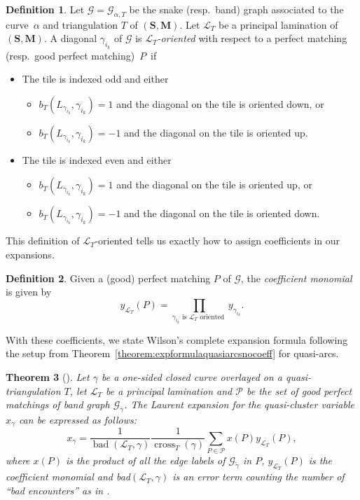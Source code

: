 \documentclass[10pt,a4paper]{amsart}
\numberwithin{equation}{section}
\newtheorem{Theorem}{Theorem}[section]
\theoremstyle{definition}
\newtheorem{Definition}[Theorem]{Definition}
\newcommand{\SM}{(\mathbf{S}, \mathbf{M})}
\begin{document}
\begin{Definition}\label{definition:L_Toriented}
Let $\mathcal{G} = \mathcal{G}_{\alpha, T}$ be the snake (resp.\ band) graph associated to the curve~$\alpha$ and triangulation $T$ of $\SM$. Let $\mathcal{L}_T$ be a principal lamination of~$\SM$. A diagonal $\gamma_{i_k}$ of $\mathcal{G}$ is \emph{$\mathcal{L}_T$-oriented} with respect to a perfect matching (resp.\ good perfect matching)~$P$~if
\begin{itemize}\itemsep=0pt
 \item The tile is indexed odd and either
 \begin{itemize}\itemsep=0pt
 \item $b_T(L_{\gamma_{i_k}}, \gamma_{i_k}) = 1$ and the diagonal on the tile is oriented down, or
 \item $b_T(L_{\gamma_{i_k}}, \gamma_{i_k}) = -1$ and the diagonal on the tile is oriented up.
 \end{itemize}
 \item The tile is indexed even and either
 \begin{itemize}\itemsep=0pt
 \item $b_T(L_{\gamma_{i_k}}, \gamma_{i_k}) = 1$ and the diagonal on the tile is oriented up, or
 \item $b_T(L_{\gamma_{i_k}}, \gamma_{i_k}) = -1$ and the diagonal on the tile is oriented down.
 \end{itemize}
\end{itemize}
\end{Definition}

This definition of $\mathcal{L}_T$-oriented tells us exactly how to assign coefficients in our expansions.
\begin{Definition}\label{definition:wilsoncoefficients}
Given a (good) perfect matching $P$ of $\mathcal{G}$, the \emph{coefficient monomial} is given by
\[y_{\mathcal{L}_T}(P) = \prod_{\gamma_{i_k} \text{ is } \mathcal{L}_T \text{ oriented }} y_{\gamma_{i_k}}.\]
\end{Definition}

With these coefficients, we state Wilson's complete expansion formula \cite[Theorem 5.44]{Wil19} following the setup from Theorem~\ref{theorem:expformulaquasiarcsnocoeff} for quasi-arcs.

\begin{Theorem}[\cite{Wil19}]
 Let $\gamma$ be a one-sided closed curve overlayed on a quasi-triangulation $T$, let $\mathcal{L}_T$ be a principal lamination and $\mathcal{P}$ be the set of good perfect matchings of band graph $\mathcal{G}_{\overline{\gamma}}$. The Laurent expansion for the quasi-cluster variable $x_\gamma$ can be expressed as follows:
 \[x_\gamma = \frac{1}{\operatorname{bad}(\mathcal{L}_T,\gamma)}\frac{1}{\operatorname{cross}_T(\gamma)} \sum_{P \in \mathcal{P}} x(P) y_{\mathcal{L}_T}(P),\]
 where $x(P)$ is the product of all the edge labels of $\mathcal{G}_{\tilde{\gamma}}$ in $P$, $y_{\mathcal{L}_T}(P)$ is the coefficient monomial and bad$(\mathcal{L}_T,\gamma)$ is an error term counting the number of ``bad encounters'' as in {\rm\cite[\emph{Definition}~5.40]{Wil19}}.
\end{Theorem}
\end{document}
